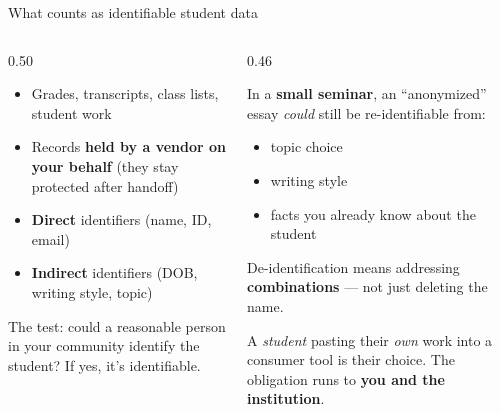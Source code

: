 \documentclass[aspectratio=169, 10pt]{beamer}
\begin{document}
\begin{frame}{What counts as identifiable student data}
\vskip-2pt
\begin{columns}[T]
\begin{column}{0.50\textwidth}
\begin{tcolorbox}[keybox, title={\faLock\quad FERPA covers\ldots}, top=2pt, bottom=2pt]
\small
\begin{itemize}\setlength{\itemsep}{1pt}
  \item Grades, transcripts, class lists, student work
  \item Records \textbf{held by a vendor on your behalf} (they stay protected after handoff)
  \item \textbf{Direct} identifiers (name, ID, email)
  \item \textbf{Indirect} identifiers (DOB, writing style, topic)
\end{itemize}
\vskip2pt
\footnotesize The test: could a reasonable person in your community identify the student? If yes, it's identifiable.
\end{tcolorbox}
\end{column}
\begin{column}{0.46\textwidth}
\begin{tcolorbox}[coralbox, title={\faExclamationTriangle\quad The mosaic effect}, top=2pt, bottom=2pt]
\small
In a \textbf{small seminar}, an ``anonymized'' essay \emph{could} still be re-identifiable from:
\vskip2pt
\begin{itemize}\setlength{\itemsep}{1pt}
  \item topic choice
  \item writing style
  \item facts you already know about the student
\end{itemize}
\vskip2pt
De-identification means addressing \textbf{combinations} --- not just deleting the name.
\end{tcolorbox}
\vskip3pt
\begin{tcolorbox}[quotebox, top=2pt, bottom=2pt]
\scriptsize A \emph{student} pasting their \emph{own} work into a consumer tool is their choice. The obligation runs to \textbf{you and the institution}.
\end{tcolorbox}
\end{column}
\end{columns}
\end{frame}
\end{document}
